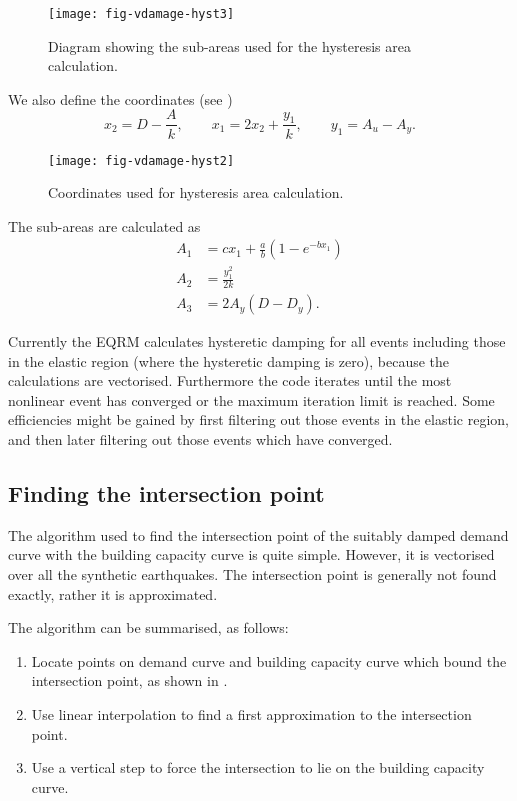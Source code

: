 \begin{figure}[htp]
\centering
{}
\texttt{[image: fig-vdamage-hyst3]}
\caption{Diagram showing the sub-areas used for the hysteresis
area calculation.}
\label{fig:vdamage-hyst3}
\end{figure}


We also define the coordinates (see )
$$
x_2 = D-\frac{A}{k}, \qquad x_1 = 2x_2+\frac{y_1}{k}, \qquad y_1 =
A_u-A_y.
$$

\begin{figure}[htp]
\centering {}  
  
\texttt{[image: fig-vdamage-hyst2]}
\caption{Coordinates used for hysteresis area calculation.}
\label{fig:vdamage-hyst2}
\end{figure}

The sub-areas are calculated as
\begin{align*}
 A_1 &= cx_1+\frac{a}{b}(1-e^{-bx_1})\\
 A_2 &= \frac{y_1^2}{2k}\\
 A_3 &= 2A_y(D-D_y).
\end{align*}

Currently the EQRM calculates
hysteretic damping for all events including those in the elastic
region (where the hysteretic damping is zero), because the
calculations are vectorised. Furthermore the code iterates until
the most nonlinear event has converged or the maximum iteration
limit is reached. Some efficiencies might be gained by first
filtering out those events in the elastic region, and then later
filtering out those events which have converged.


\subsection{Finding the intersection point}

The algorithm used to find the intersection point of the suitably
damped demand curve with the building capacity
curve is quite simple. However, it is
vectorised over all the synthetic earthquakes. The intersection
point is generally not found exactly, rather it is approximated.

The algorithm can be summarised, as follows:
\begin{enumerate}
\item Locate points on demand curve and
building capacity curve which bound the
intersection point, as shown in .
\item Use linear interpolation to find a first approximation to
the
  intersection point.
\item Use a vertical step to force the intersection to lie on the
  building capacity curve.
\end{enumerate}


